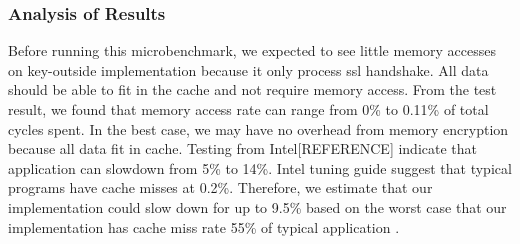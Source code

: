 \documentclass[../../../main.tex]{subfiles}
\begin{document}
\subsubsection*{Analysis of Results}
Before running this microbenchmark, we expected to see little memory
 accesses on key-outside implementation because it only process ssl
 handshake. All data should be able to fit in the cache and not require
 memory access. From the test result, we found that memory access rate can 
 range from 0\% to 0.11\% of total cycles spent.  In the best case, we may 
 have no overhead from memory encryption because all data fit in cache. 
 Testing from Intel[REFERENCE] indicate that application can slowdown from 
 5\% to 14\%. Intel tuning guide suggest that typical programs have cache 
 misses at 0.2\%. Therefore, we estimate that our implementation could slow 
 down for up to 9.5\% based on the worst case that our implementation has 
 cache miss rate 55\% of typical application .
\end{document}
